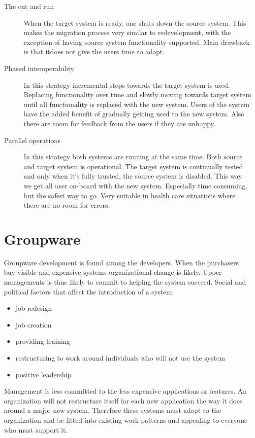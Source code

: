 \begin{description}
\item[The cut and run] When the target system is ready, one shuts down the source system.
This makes the migration process very similar to redevelopment, with the exception of having source system functionality supported. Main drawback is that itdoes not give the users time to adapt.

\item[Phased interoperability] In this strategy incremental steps towards the target system is used. Replacing functionality over time and slowly moving towards target system until all functionality is replaced with the new system. Users of the system have the added benefit of gradually getting used to the new system. Also there are room for feedback from the users if they are unhappy.

\item[Parallel operations] In this strategy both systems are running at the same time. Both source and target system is operational. 
The target system is continually tested and only when it's fully trusted, the source system is disabled. This way we get all user on-board with the new system. Especially time consuming, but the safest way to go. Very suitable in health care situations where there are no room for errors.
\end{description}

\cite{leg:jdbj}

\section{Groupware}
Groupware development is found among the developers.
When the purchasers buy visible and expensive systems organizational change is likely.
Upper managements is thus likely to commit to helping the system succeed.
Social and political factors that affect the introduction of a system.

\begin{itemize}
\item job redesign 
\item job creation
\item providing training
\item restructuring to work around individuals who will not use the system
\item positive leadership
\end{itemize}

Management is less committed to the less expensive applications or features.
An organization will not restructure itself for each new application the way it does around a major new system. Therefore these systems must adapt to the organization and be fitted into existing work patterns and appealing to everyone who must support it. 